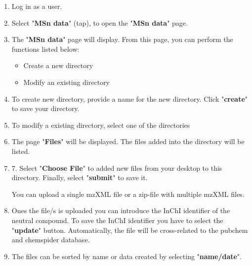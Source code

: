 \documentclass[12pt]{report}
\begin{document}
\begin{enumerate}

\item Log in as a user. 
\item Select "\textbf{MSn data}" (tap), to open the "\textbf{MSn data}" page.
\item The "\textbf{MSn data}" page will display. From this page, you can perform the functions listed below:
\begin{itemize}
    \item Create a new directory
    \item Modify an existing directory
\end{itemize}
\item To create new directory, provide a name for the new directory. Click "\textbf{create}" to save your directory.
			
\begin{center}
\begin{figure}[H]
\end{figure}
\end{center}

\item To modify a existing directory, select one of the directories

\begin{center}
\begin{figure}[H]
\end{figure}
\end{center}

\item The page "\textbf{Files}" will be displayed. The files added into the
directory will be listed.

\item 7. Select "\textbf{Choose File}" to added new files from your
desktop to this directory. Finally, select "\textbf{submit}" to
save it.

You can upload a single mzXML file or a zip-file with multiple mzXML files.

\item Ones the file/s is uploaded you can introduce the InChI identifier of the
neutral compound. To save the InChI identifier you have to select the "\textbf{update}" button. Automatically, the file will be cross-related to the pubchem and chemspider database.
\item The files can be sorted by name or data created by selecting
"\textbf{name/date}".

\end{enumerate}
\end{document}

